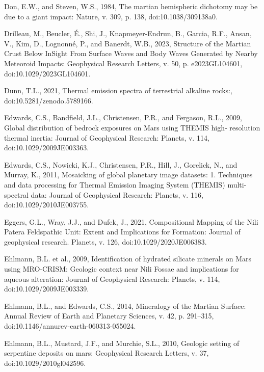 \documentclass[11pt]{article}
\begin{document}
\begin{thebibliography}{99}
 Don, E.W., and Steven, W.S., 1984, The martian hemispheric dichotomy may be due to a giant impact: Nature, v. 309, p. 138, doi:10.1038/309138a0.

 Drilleau, M., Beucler, É., Shi, J., Knapmeyer-Endrun, B., Garcia, R.F., Ansan, V., Kim, D., Lognonné, P., and Banerdt, W.B., 2023, Structure of the Martian Crust Below InSight From Surface Waves and Body Waves Generated by Nearby Meteoroid Impacts: Geophysical Research Letters, v. 50, p. e2023GL104601, doi:10.1029/2023GL104601.

 Dunn, T.L., 2021, Thermal emission spectra of terrestrial alkaline rocks:, doi:10.5281/zenodo.5789166.

 Edwards, C.S., Bandfield, J.L., Christensen, P.R., and Fergason, R.L., 2009, Global distribution of bedrock exposures on Mars using THEMIS high‐ resolution thermal inertia: Journal of Geophysical Research: Planets, v. 114, doi:10.1029/2009JE003363.

 Edwards, C.S., Nowicki, K.J., Christensen, P.R., Hill, J., Gorelick, N., and Murray, K., 2011, Mosaicking of global planetary image datasets: 1. Techniques and data processing for Thermal Emission Imaging System (THEMIS) multi-spectral data: Journal of Geophysical Research: Planets, v. 116, doi:10.1029/2010JE003755.

 Eggers, G.L., Wray, J.J., and Dufek, J., 2021, Compositional Mapping of the Nili Patera Feldspathic Unit: Extent and Implications for Formation: Journal of geophysical research. Planets, v. 126, doi:10.1029/2020JE006383.

 Ehlmann, B.L. et al., 2009, Identification of hydrated silicate minerals on Mars using MRO-CRISM: Geologic context near Nili Fossae and implications for aqueous alteration: Journal of Geophysical Research: Planets, v. 114, doi:10.1029/2009JE003339.

 Ehlmann, B.L., and Edwards, C.S., 2014, Mineralogy of the Martian Surface: Annual Review of Earth and Planetary Sciences, v. 42, p. 291--315, doi:10.1146/annurev-earth-060313-055024.

 Ehlmann, B.L., Mustard, J.F., and Murchie, S.L., 2010, Geologic setting of serpentine deposits on mars: Geophysical Research Letters, v. 37, doi:10.1029/2010gl042596.


\end{thebibliography}
\end{document}
